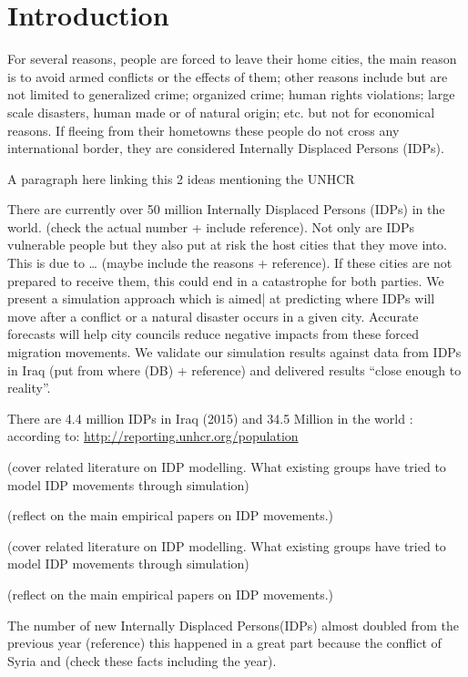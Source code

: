 \documentclass[11pt]{article}
\author{BotAnihilator}
\date{\today}
\title{}
\begin{document}
\tableofcontents


\section{Introduction}
\label{sec:orgheadline1}
For several reasons,  people are forced to leave their home cities, the main reason is to avoid armed conflicts or the effects of them; other reasons include but are not limited to generalized crime; organized crime; human rights violations; large scale disasters, human made or of natural origin; etc. but not for economical reasons. If fleeing from their hometowns these people do not cross any international border, they are considered Internally Displaced Persons (IDPs).

A paragraph here linking this 2 ideas mentioning  the UNHCR

There are currently over 50 million Internally Displaced Persons (IDPs) in the world. (check the actual number + include reference). Not only are IDPs vulnerable people but they also put at risk the host cities that they move into. This is due to … (maybe include the reasons + reference). If these cities are not prepared to receive them, this could end in a catastrophe for both parties. We present a simulation approach which is aimed| at predicting where IDPs will move  after a conflict or a natural disaster occurs in a given city. Accurate forecasts will help city councils  reduce negative impacts from these forced migration movements. We validate our simulation results against data from IDPs in Iraq (put from where (DB) + reference) and delivered results “close enough to reality”.

There are 4.4 million IDPs in Iraq (2015) and 34.5 Million in the world : according to: \url{http://reporting.unhcr.org/population}

(cover related literature on IDP modelling. What existing groups have tried to model IDP movements through simulation)

(reflect on the main empirical papers on IDP movements.)

(cover related literature on IDP modelling. What existing groups have tried to model IDP movements through simulation)

(reflect on the main empirical papers on IDP movements.)

The number of new Internally Displaced Persons(IDPs) almost doubled from the previous year (reference) this happened in a great part because the conflict of Syria and (check these facts including the year).
\end{document}
